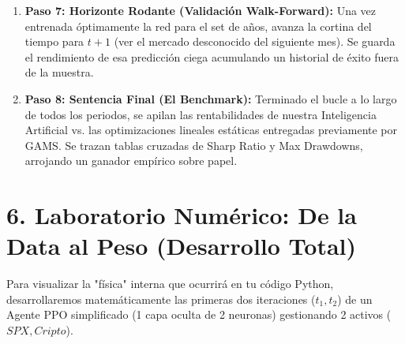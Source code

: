 \documentclass[11pt,a4paper]{article}
\begin{document}
\begin{enumerate}
\begin{itemize}
        \item \textbf{Optimización Adaptativa (ADAM):} 
        En lugar de una tasa de aprendizaje fija, usamos el algoritmo \textbf{ADAM}. Este ajusta los pesos $\theta$ usando el primer momento $m_t$ (media) y el segundo momento $v_t$ (varianza no centrada) de los gradientes:
        \begin{equation}
            m_t = \beta_1 m_{t-1} + (1-\beta_1) \nabla_\theta L, \quad v_t = \beta_2 v_{t-1} + (1-\beta_2) (\nabla_\theta L)^2
        \end{equation}
        La actualización final de cada peso es: $\theta_{new} \leftarrow \theta_{old} - \frac{\eta}{\sqrt{\hat{v}_t} + \epsilon} \hat{m}_t$, donde $\eta$ se adapta dinámicamente según el ruido bursátil captado en los momentos previos.
    \end{itemize}
    \item \textbf{Paso 7: Horizonte Rodante (Validación Walk-Forward):} Una vez entrenada óptimamente la red para el set de años, avanza la cortina del tiempo para $t+1$ (ver el mercado desconocido del siguiente mes). Se guarda el rendimiento de esa predicción ciega acumulando un historial de éxito fuera de la muestra.
    \item \textbf{Paso 8: Sentencia Final (El Benchmark):} Terminado el bucle a lo largo de todos los periodos, se apilan las rentabilidades de nuestra Inteligencia Artificial vs. las optimizaciones lineales estáticas entregadas previamente por GAMS. Se trazan tablas cruzadas de Sharp Ratio y Max Drawdowns, arrojando un ganador empírico sobre papel.
\end{enumerate}

\section{6. Laboratorio Numérico: De la Data al Peso (Desarrollo Total)}
Para visualizar la "física" interna que ocurrirá en tu código Python, desarrollaremos matemáticamente las primeras dos iteraciones ($t_1, t_2$) de un Agente PPO simplificado (1 capa oculta de 2 neuronas) gestionando 2 activos ($SPX, Cripto$).
\end{document}
